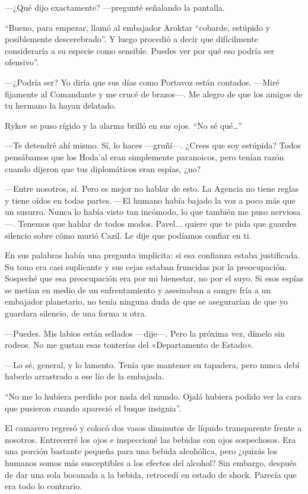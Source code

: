 —¿Qué dijo exactamente? —pregunté señalando la pantalla.

``Bueno, para empezar, llamó al embajador Aroktar ``cobarde, estúpido y posiblemente descerebrado''. Y luego procedió a decir que difícilmente consideraría a su especie como sensible. Puedes ver por qué eso podría ser ofensivo''.

—¿Podría ser? Yo diría que sus días como Portavoz están contados. —Miré fijamente al Comandante y me crucé de brazos—. Me alegro de que los amigos de tu hermano la hayan delatado.

Rykov se puso rígido y la alarma brilló en sus ojos. ``No sé qué…''


—Te detendré ahí mismo. Sí, lo haces —gruñí—. ¿Crees que soy estúpida? Todos pensábamos que los Hoda'al eran simplemente paranoicos, pero tenían razón cuando dijeron que tus diplomáticos eran espías, ¿no?

—Entre nosotros, sí. Pero es mejor no hablar de esto. La Agencia no tiene reglas y tiene oídos en todas partes. —El humano había bajado la voz a poco más que un susurro. Nunca lo había visto tan incómodo, lo que también me puso nerviosa—. Tenemos que hablar de todos modos. Pavel... quiere que te pida que guardes silencio sobre cómo murió Cazil. Le dije que podíamos confiar en ti.

En sus palabras había una pregunta implícita: si esa confianza estaba justificada. Su tono era casi suplicante y sus cejas estaban fruncidas por la preocupación. Sospeché que esa preocupación era por mi bienestar, no por el suyo. Si esos espías se metían en medio de un enfrentamiento y asesinaban a sangre fría a un embajador planetario, no tenía ninguna duda de que se asegurarían de que yo guardara silencio, de una forma u otra.

—Puedes. Mis labios están sellados —dije—. Pero la próxima vez, dímelo sin rodeos. No me gustan esas tonterías del «Departamento de Estado».

—Lo sé, general, y lo lamento. Tenía que mantener su tapadera, pero nunca debí haberlo arrastrado a ese lío de la embajada.

``No me lo hubiera perdido por nada del mundo. Ojalá hubiera podido ver la cara que pusieron cuando apareció el buque insignia''.

El camarero regresó y colocó dos vasos diminutos de líquido transparente frente a nosotros. Entrecerré los ojos e inspeccioné las bebidas con ojos sospechosos. Era una porción bastante pequeña para una bebida alcohólica, pero ¿quizás los humanos somos más susceptibles a los efectos del alcohol? Sin embargo, después de dar una sola bocanada a la bebida, retrocedí en estado de shock. Parecía que era todo lo contrario.

